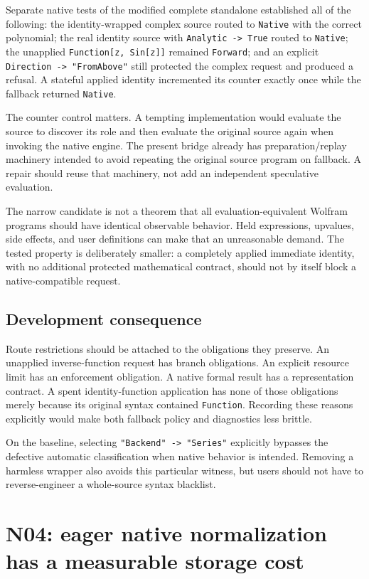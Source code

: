 \documentclass[11pt]{article}
\newcommand{\code}[1]{\texttt{#1}}
\begin{document}
Separate native tests of the modified complete standalone established all of the following: the identity-wrapped complex source routed to \code{Native} with the correct polynomial; the real identity source with \code{Analytic -> True} routed to \code{Native}; the unapplied \code{Function[z, Sin[z]]} remained \code{Forward}; and an explicit \code{Direction -> "FromAbove"} still protected the complex request and produced a refusal. A stateful applied identity incremented its counter exactly once while the fallback returned \code{Native}.

The counter control matters. A tempting implementation would evaluate the source to discover its role and then evaluate the original source again when invoking the native engine. The present bridge already has preparation/replay machinery intended to avoid repeating the original source program on fallback. A repair should reuse that machinery, not add an independent speculative evaluation.\cite{contracts,bridge}

The narrow candidate is not a theorem that all evaluation-equivalent Wolfram programs should have identical observable behavior. Held expressions, upvalues, side effects, and user definitions can make that an unreasonable demand. The tested property is deliberately smaller: a completely applied immediate identity, with no additional protected mathematical contract, should not by itself block a native-compatible request.

\subsection{Development consequence}
Route restrictions should be attached to the obligations they preserve. An unapplied inverse-function request has branch obligations. An explicit resource limit has an enforcement obligation. A native formal result has a representation contract. A spent identity-function application has none of those obligations merely because its original syntax contained \code{Function}. Recording these reasons explicitly would make both fallback policy and diagnostics less brittle.

On the baseline, selecting \code{"Backend" -> "Series"} explicitly bypasses the defective automatic classification when native behavior is intended. Removing a harmless wrapper also avoids this particular witness, but users should not have to reverse-engineer a whole-source syntax blacklist.

\section{N04: eager native normalization has a measurable storage cost}
\label{sec:storage}
\end{document}
